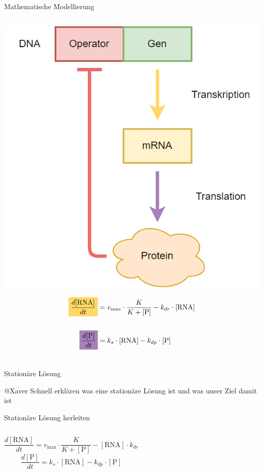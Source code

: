 \documentclass[11pt,aspectratio=169,reqno]{beamer}
\begin{document}
\begin{frame}{Mathematische Modellierung}
    \begin{columns}
        \includegraphics[width=\textwidth]{images/repression.png}
        \begin{align*}
            \colorbox[HTML]{FFD966}{$\dfrac{d[\text{RNA}]}{dt}$}&=v_{\text{max}}\cdot\frac{K}{K+[\text{P}]}-k_{dr}\cdot [\text{RNA}]\\[16pt]
            \colorbox[HTML]{A680B8}{$\dfrac{d[\text{P}]}{dt}$}&=k_s\cdot[\text{RNA}]-k_{dp}\cdot[\text{P}]
        \end{align*}
    \end{columns}
\end{frame}

\begin{frame}[t]{Stationäre Lösung}

    @Xaver Schnell erklären was eine stationäre Lösung ist und was unser Ziel damit ist

\end{frame}

\begin{frame}[t]{Stationäre Lösung herleiten}
    \begin{columns}[t]
            \[\frac{d[\text{RNA}]}{dt}=v_{\text{max}}\cdot\frac{K}{K+[\text{P}]}-[\text{RNA}] \cdot k_{dr}\]
            \[\frac{d[\text{P}]}{dt}= k_s\cdot[\text{RNA}]-k_{dp}\cdot[\text{P}]\]
    \end{columns}
\end{frame}
\end{document}

